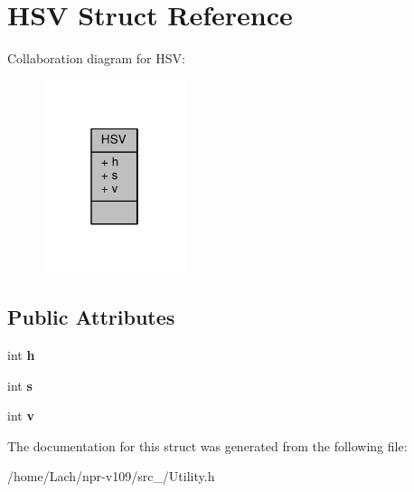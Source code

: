 \hypertarget{structHSV}{}\section{H\+SV Struct Reference}
\label{structHSV}


Collaboration diagram for H\+SV\+:
\nopagebreak
\begin{figure}[H]
\begin{center}
\leavevmode
\includegraphics[width=118pt]{structHSV__coll__graph}
\end{center}
\end{figure}
\subsection*{Public Attributes}
\begin{DoxyCompactItemize}
\item 
\hypertarget{structHSV_ab038be2f08af85438d55554c5580d79c}{}\label{structHSV_ab038be2f08af85438d55554c5580d79c} 
int {\bfseries h}
\item 
\hypertarget{structHSV_a9bb3f6690e6879d417c4488b81cf90ca}{}\label{structHSV_a9bb3f6690e6879d417c4488b81cf90ca} 
int {\bfseries s}
\item 
\hypertarget{structHSV_acf84a724f9e1478f30f1238ca487ad69}{}\label{structHSV_acf84a724f9e1478f30f1238ca487ad69} 
int {\bfseries v}
\end{DoxyCompactItemize}


The documentation for this struct was generated from the following file\+:\begin{DoxyCompactItemize}
\item 
/home/\+Lach/npr-\/v109/src\+\_/Utility.\+h\end{DoxyCompactItemize}
